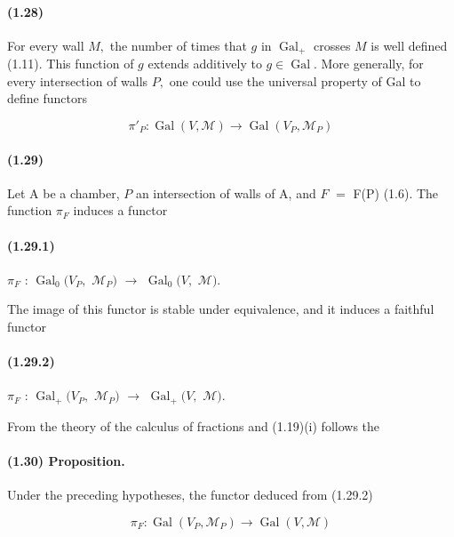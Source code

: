 \documentclass[10pt,a4paper]{article}
\begin{document}
\paragraph{(1.28)} For every wall \ensuremath{M,} the number of times that \ensuremath{g} in \ensuremath{\operatorname{Gal}_+} crosses \ensuremath{M} is well defined (1.11). This function of \ensuremath{g} extends additively to \ensuremath{g\in{}\operatorname{Gal}.} More generally, for every intersection of walls \ensuremath{P,} one could use the universal property of Gal to define functors

\[
\pi{}'_P : \operatorname{Gal}(V, \mathcal{M}) \longrightarrow{} \operatorname{Gal}(V_P, \mathcal{M}_P)
\]

\paragraph{(1.29)} Let A be a chamber, \ensuremath{P} an intersection of walls of A, and \ensuremath{F} \ensuremath{=} F(P) (1.6). The function \ensuremath{\pi{}_F} induces a functor

\paragraph{(1.29.1)} \ensuremath{\pi{}_F} : \ensuremath{\operatorname{Gal}_0(V_P,} \ensuremath{\mathcal{M}_P)} \ensuremath{\longrightarrow{}} \ensuremath{\operatorname{Gal}_0(V,} \ensuremath{\mathcal{M}).}

The image of this functor is stable under equivalence, and it induces a faithful functor\par

\paragraph{(1.29.2)} \ensuremath{\pi{}_F} : \ensuremath{\operatorname{Gal}_+(V_P,} \ensuremath{\mathcal{M}_P)} \ensuremath{\longrightarrow{}} \ensuremath{\operatorname{Gal}_+(V,} \ensuremath{\mathcal{M}).}

From the theory of the calculus of fractions and (1.19)(i) follows the\par

\paragraph{(1.30) Proposition.} Under the preceding hypotheses, the functor deduced from (1.29.2)

\[
\pi{}_F : \operatorname{Gal}(V_P, \mathcal{M}_P) \longrightarrow{} \operatorname{Gal}(V, \mathcal{M})
\]
\end{document}
